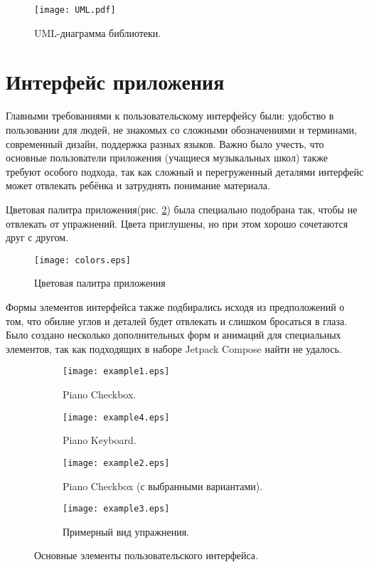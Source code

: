 \begin{figure}[H]
  \centering
  \texttt{[image: UML.pdf]}
  \caption{UML-диаграмма библиотеки.}
  \label{fig:boat1}
\end{figure}

\section{Интерфейс приложения}
Главными требованиями к пользовательскому интерфейсу были: удобство в пользовании для людей, не знакомых со сложными обозначениями и терминами, современный дизайн, поддержка разных языков. Важно было учесть, что основные пользователи приложения (учащиеся музыкальных школ) также требуют особого подхода, так как сложный и перегруженный деталями интерфейс может отвлекать ребёнка и затруднять понимание материала.\par 
Цветовая палитра приложения(рис. \ref{fig:colors}) была специально подобрана так, чтобы не отвлекать от упражнений. Цвета приглушены, но при этом хорошо сочетаются друг с другом.\par

\begin{figure}[H]
  \centering
  \texttt{[image: colors.eps]}
  \caption{Цветовая палитра приложения}
  \label{fig:colors}
\end{figure}

Формы элементов интерфейса также подбирались исходя из предположений о том, что обилие углов и деталей будет отвлекать и слишком бросаться в глаза. Было создано несколько дополнительных форм и анимаций для специальных элементов, так как подходящих в наборе Jetpack Compose найти не удалось.\par

\begin{figure}[H]
  \centering
  \begin{subfigure}[b]{0.35\linewidth}
    \texttt{[image: example1.eps]}
    \caption{Piano Checkbox.}
  \end{subfigure}
  \begin{subfigure}[b]{0.4\linewidth}
    \texttt{[image: example4.eps]}
    \caption{Piano Keyboard.}
  \end{subfigure}
  \begin{subfigure}[b]{0.4\linewidth}
    \texttt{[image: example2.eps]}
    \caption{Piano Checkbox (с выбранными вариантами).}
  \end{subfigure}
    \begin{subfigure}[b]{0.3\linewidth}
    \texttt{[image: example3.eps]}
    \caption{Примерный вид упражнения.}
  \end{subfigure}
  \caption{Основные элементы пользовательского интерфейса.}
  \label{fig:app}
\end{figure}